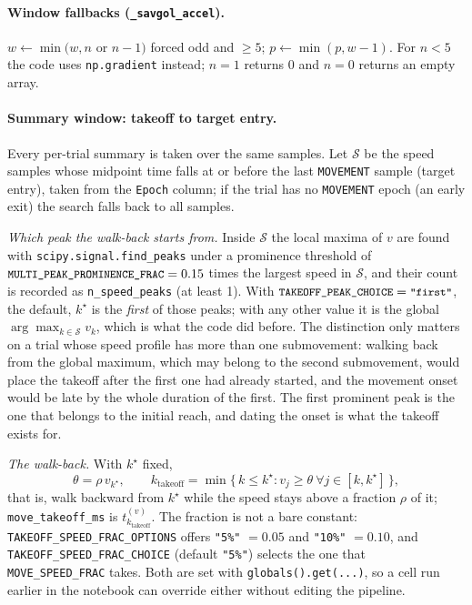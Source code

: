 \documentclass[11pt,a4paper]{article}
\newcommand{\code}[1]{\texttt{\small #1}}
\begin{document}
\paragraph{Window fallbacks (\code{\_savgol\_accel}).}
$w \leftarrow \min(w, n$ or $n-1)$ forced odd and $\ge 5$;
$p \leftarrow \min(p, w-1)$. For $n < 5$ the code uses \code{np.gradient}
instead; $n = 1$ returns 0 and $n = 0$ returns an empty array.

\paragraph{Summary window: takeoff to target entry.} Every per-trial summary is
taken over the same samples. Let $\mathcal{S}$ be the speed samples whose
midpoint time falls at or before the last \code{MOVEMENT} sample (target entry),
taken from the \code{Epoch} column; if the trial has no \code{MOVEMENT} epoch
(an early exit) the search falls back to all samples.

\emph{Which peak the walk-back starts from.} Inside $\mathcal{S}$ the local
maxima of $v$ are found with \code{scipy.signal.find\_peaks} under a prominence
threshold of $\code{MULTI\_PEAK\_PROMINENCE\_FRAC} = 0.15$ times the largest
speed in $\mathcal{S}$, and their count is recorded as \code{n\_speed\_peaks}
(at least 1). With $\code{TAKEOFF\_PEAK\_CHOICE} = \code{"first"}$, the default,
$k^\star$ is the \emph{first} of those peaks; with any other value it is the
global $\arg\max_{k \in \mathcal{S}} v_k$, which is what the code did before.
The distinction only matters on a trial whose speed profile has more than one
submovement: walking back from the global maximum, which may belong to the
second submovement, would place the takeoff after the first one had already
started, and the movement onset would be late by the whole duration of the
first. The first prominent peak is the one that belongs to the initial reach,
and dating the onset is what the takeoff exists for.

\emph{The walk-back.} With $k^\star$ fixed,
\begin{equation}
  \theta = \rho\, v_{k^\star},
  \qquad
  k_{\text{takeoff}} = \min\{\,k \le k^\star : v_j \ge \theta\ \forall j \in [k, k^\star]\,\},
  \label{eq:takeoff}
\end{equation}
that is, walk backward from $k^\star$ while the speed stays above a fraction
$\rho$ of it; \code{move\_takeoff\_ms} is $t^{(v)}_{k_{\text{takeoff}}}$. The
fraction is not a bare constant: \code{TAKEOFF\_SPEED\_FRAC\_OPTIONS} offers
\code{"5\%"} $= 0.05$ and \code{"10\%"} $= 0.10$, and
\code{TAKEOFF\_SPEED\_FRAC\_CHOICE} (default \code{"5\%"}) selects the one that
\code{MOVE\_SPEED\_FRAC} takes. Both are set with
\code{globals().get(...)}, so a cell run earlier in the notebook can override
either without editing the pipeline.
\end{document}

